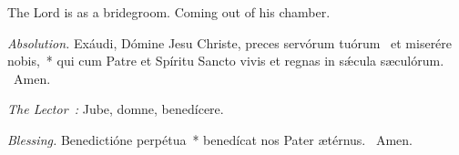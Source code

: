 {

  {
    \def\preant{\setgrefactor{17}\normalsize\vspace{-\baselineskip}\emph{Celebrant intones:}

    \large}
    \def\preantafter{\setgrefactor{17}\large}
    \def\prepsalm{\normalsize}
    \def\prepsalmtext{\vspace{-\baselineskip}\emph{First Cantor intones:}

    }
    \def\anttranslation{The Lord hath said unto me: Thou art My son, this day have I begotten thee.}
    \def\psalmclef{2}
  }

  {
    \def\preant{\setgrefactor{17}\normalsize\emph{Second Cantor intones:}

    \large}
    \def\preantafter{\setgrefactor{17}\large}
    \def\prepsalm{\normalsize}
    \def\anttranslation{The Lord is as a bridegroom coming out of his chamber.}
  }

  {
    \def\preant{\setgrefactor{17}\normalsize\emph{First Cantor intones:}

    \large}
    \def\preantafter{\setgrefactor{17}\large}
    \def\prepsalm{\normalsize}
    \def\anttranslation{Grace is poured into thy lips, therefore God hath blessed thee for ever.}
  }

  \bigskip
  {
    {The Lord is as a bridegroom.}
    {Coming out of his chamber.}
  }

  {
    \bigskip

    \emph{Absolution.} Exáudi, Dómine Jesu Christe, preces servórum tuórum~\dag{} et miserére nobis,~* qui cum Patre et Spíritu Sancto vivis et regnas in sǽcula sæculórum. \Rbar{}~Amen.

    \emph{The Lector~:} Jube, domne, benedícere.

    \emph{Blessing.} Benedictióne perpétua~* benedícat nos Pater ætérnus. \Rbar{}~Amen.

}}

